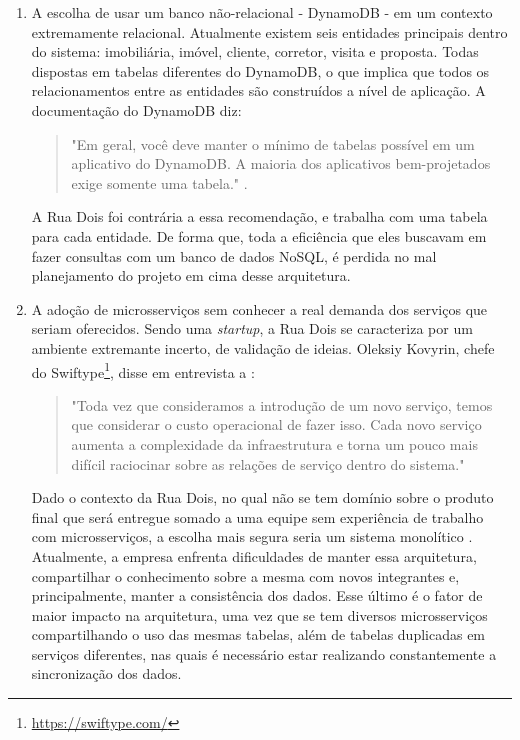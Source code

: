   \begin{enumerate}
    \item A escolha de usar um banco não-relacional - DynamoDB - em um
    contexto extremamente relacional. Atualmente existem seis entidades
    principais dentro do sistema: imobiliária, imóvel, cliente, corretor,
    visita e proposta. Todas dispostas em tabelas diferentes do DynamoDB,
    o que implica que todos os relacionamentos entre as entidades são
    construídos a nível de aplicação. A documentação do DynamoDB diz:
      \begin{quotation}
        "Em geral, você deve manter o mínimo de tabelas possível em um
        aplicativo do DynamoDB. A maioria dos aplicativos bem-projetados exige
        somente uma tabela." \cite{doc:dynamodbModeling}.
      \end{quotation}
    A Rua Dois foi contrária a essa recomendação, e trabalha com uma tabela
    para cada entidade. De forma que, toda a eficiência que eles
    buscavam em fazer consultas com um banco de dados NoSQL, é perdida
    no mal planejamento do projeto em cima desse arquitetura.
    \item A adoção de microsserviços sem conhecer a real demanda dos
    serviços que seriam oferecidos. Sendo uma \textit{startup}, a Rua Dois
    se caracteriza por um ambiente extremante incerto, de validação de ideias.
    Oleksiy Kovyrin, chefe do Swiftype\footnote{\url{https://swiftype.com/}},
    disse em entrevista a :
      \begin{quotation}
        "Toda vez que consideramos a introdução de um novo serviço, temos que
        considerar o custo operacional de fazer isso. Cada novo serviço aumenta a
        complexidade da infraestrutura e torna um pouco mais difícil raciocinar
        sobre as relações de serviço dentro do sistema."
      \end{quotation}
    Dado o contexto da Rua Dois, no qual não se tem domínio sobre o produto final
    que será entregue somado a uma equipe sem experiência de trabalho com microsserviços,
    a escolha mais segura seria um sistema monolítico \cite{JakeLumetta}.
    Atualmente, a empresa enfrenta dificuldades de manter essa arquitetura,
    compartilhar o conhecimento sobre a mesma com novos integrantes e, principalmente,
    manter a consistência dos dados. Esse último é o fator de maior impacto
    na arquitetura, uma vez que se tem diversos microsserviços compartilhando
    o uso das mesmas tabelas, além de tabelas duplicadas em serviços diferentes,
    nas quais é necessário estar realizando constantemente a sincronização dos dados.


\end{enumerate}
